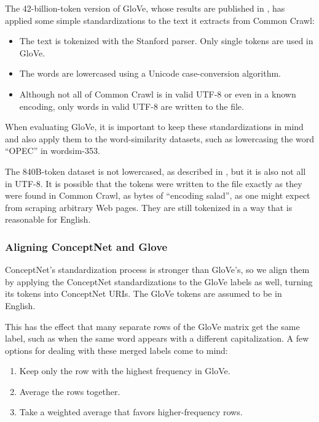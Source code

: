 \documentclass[letterpaper]{article}
\begin{document}
The 42-billion-token version of GloVe, whose results are published in
\cite{pennington2014glove}, has applied some simple standardizations
to the text it extracts from Common Crawl:

\begin{itemize}
\item The text is tokenized with the Stanford parser. Only single tokens are
    used in GloVe.
\item The words are lowercased using a Unicode case-conversion
    algorithm.
\item Although not all of Common Crawl is in valid UTF-8 or even in a known
    encoding, only words in valid UTF-8 are written to the file.
\end{itemize}

When evaluating GloVe, it is important to keep these standardizations in mind
and also apply them to the word-similarity datasets, such as lowercasing the
word ``OPEC'' in {\sc wordsim-353}.

The 840B-token dataset is not lowercased, as described in
\cite{pennington2014glove}, but it is also not all in UTF-8. It is possible
that the tokens were written to the file exactly as they were found in
Common Crawl, as bytes of ``encoding salad'', as one might expect from
scraping arbitrary Web pages. They are still tokenized in a way that is
reasonable for English.

\subsubsection{Aligning ConceptNet and Glove}

ConceptNet's standardization process is stronger than GloVe's, so we align them
by applying the ConceptNet standardizations to the GloVe labels as well, turning
its tokens into ConceptNet URIs. The GloVe tokens are assumed to be in English.

This has the effect that many separate rows of the GloVe matrix get the same
label, such as when the same word appears with a different capitalization. A
few options for dealing with these merged labels come to mind:

\begin{enumerate}
\item Keep only the row with the highest frequency in GloVe.
\item Average the rows together.
\item Take a weighted average that favors higher-frequency rows.
\end{enumerate}
\end{document}

